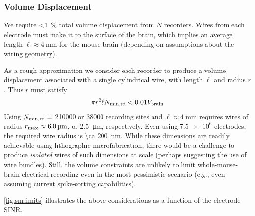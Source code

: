 \subsubsection{Volume Displacement}

We require \SI{<1}{\percent} total volume displacement from $N$ recorders.
Wires from each electrode must make it to the surface of the brain, which implies an average length $\ell\approx\SI{4}{\milli\meter}$ for the mouse brain (depending on assumptions about the wiring geometry).

As a rough approximation we consider each recorder to produce a volume displacement associated with a single cylindrical wire, with length $\ell$ and radius $r$.
Thus $r$ must satisfy \[\pi r^2\ell N_{\text{\scriptsize min,rd}} < 0.01V_{\text{\scriptsize brain}}\]
Using $N_{\text{\scriptsize min,rd}} =$ \num{210000} or \num{38000} recording sites and $\ell\approx\SI{4}{\milli\meter}$ requires wires of radius $r_{\text{\scriptsize max}} \approx \SI{6.0}{\micro\meter}$, or \SI{2.5}{\micro\meter}, respectively. 
Even using $\num{7.5e6}$ electrodes, the required wire radius is \SI{\ca 200}{\nano\meter}.
While these dimensions are readily achievable using lithographic microfabrication, there would be a challenge to produce \emph{isolated} wires of such dimensions at scale (perhaps suggesting the use of wire bundles).
Still, the volume constraints are unlikely to limit whole-mouse-brain electrical recording even in the most pessimistic scenario (e.g., even assuming current spike-sorting capabilities).

\autoref{fig:snrlimits} illustrates the above considerations as a function of the electrode SINR.

